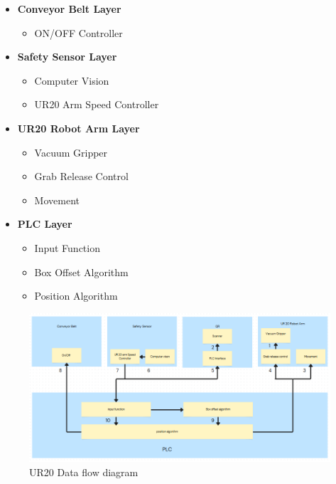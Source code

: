 
\begin{itemize}
    \item \textbf{Conveyor Belt Layer}
    \begin{itemize}
        \item ON/OFF Controller
    \end{itemize}

    \item \textbf{Safety Sensor Layer}
    \begin{itemize}
        \item Computer Vision
        \item UR20 Arm Speed Controller
    \end{itemize}

    \item \textbf{UR20 Robot Arm Layer}
    \begin{itemize}
        \item Vacuum Gripper
        \item Grab Release Control
        \item Movement
    \end{itemize}

    \item \textbf{PLC Layer}
    \begin{itemize}
        \item Input Function
        \item Box Offset Algorithm
        \item Position Algorithm
    \end{itemize}
\end{itemize}
\begin{figure}[h!]
	\centering
 	\includegraphics[width=\textwidth]{images/data_flow}
 \caption{UR20 Data flow diagram}
\end{figure}